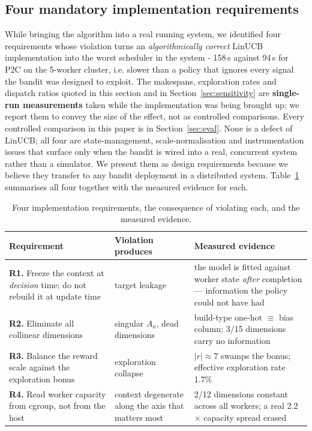 \documentclass[final,5p,times,twocolumn]{elsarticle}
\begin{document}
\subsection{Four mandatory implementation requirements}
\label{sec:reqs}

While bringing the algorithm into a real running system, we identified four requirements whose violation turns an \emph{algorithmically correct} LinUCB implementation into the worst scheduler in the system - 158\,s against 94\,s for P2C on the 5-worker cluster, i.e. slower than a policy that ignores every signal the bandit was designed to exploit. The makespans, exploration rates and dispatch ratios quoted in this section and in Section~\ref{sec:sensitivity} are \textbf{single-run measurements} taken while the implementation was being brought up; we report them to convey the size of the effect, not as controlled comparisons. Every controlled comparison in this paper is in Section~\ref{sec:eval}. None is a defect of LinUCB; all four are state-management, scale-normalisation and instrumentation issues that surface only when the bandit is wired into a real, concurrent system rather than a simulator. We present them as design requirements because we believe they transfer to any bandit deployment in a distributed system. Table~\ref{tab:reqs} summarises all four together with the measured evidence for each.

\begin{table}[t]
\centering
\caption{Four implementation requirements, the consequence of violating each, and the measured evidence.}
\label{tab:reqs}
\small
\begin{tabular}{p{5.0cm}p{4.0cm}p{7.0cm}}
\toprule
Requirement & Violation produces & Measured evidence \\
\midrule
\textbf{R1.} Freeze the context at \emph{decision} time; do not rebuild it at update time & target leakage & the model is fitted against worker state \emph{after} completion --- information the policy could not have had \\
\addlinespace
\textbf{R2.} Eliminate all collinear dimensions & singular $A_a$, dead dimensions & build-type one-hot $\equiv$ bias column; 3/15 dimensions carry no information \\
\addlinespace
\textbf{R3.} Balance the reward scale against the exploration bonus & exploration collapse & $|r|\approx7$ swamps the bonus; effective exploration rate 1.7\% \\
\addlinespace
\textbf{R4.} Read worker capacity from cgroup, not from the host & context degenerate along the axis that matters most & 2/12 dimensions constant across all workers; a real 2.2$\times$ capacity spread erased \\
\bottomrule
\end{tabular}
\end{table}
\end{document}
